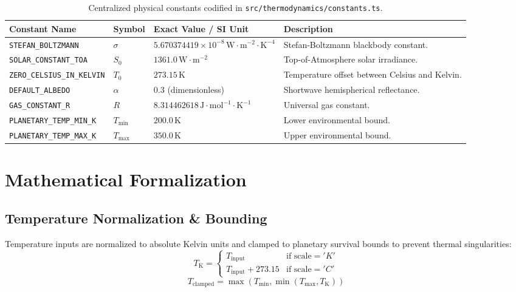 \documentclass[11pt, a4paper]{article}
\begin{document}
\begin{table}[htbp]
\centering
\begin{small}
\begin{tabular}{llll}
\toprule
\textbf{Constant Name} & \textbf{Symbol} & \textbf{Exact Value / SI Unit} & \textbf{Description} \\
\midrule
\texttt{STEFAN\_BOLTZMANN} & $\sigma$ & $5.670374419 \times 10^{-8} \, \text{W}\cdot\text{m}^{-2}\cdot\text{K}^{-4}$ & Stefan-Boltzmann blackbody constant. \\
\texttt{SOLAR\_CONSTANT\_TOA} & $S_0$ & $1361.0 \, \text{W}\cdot\text{m}^{-2}$ & Top-of-Atmosphere solar irradiance. \\
\texttt{ZERO\_CELSIUS\_IN\_KELVIN} & $T_0$ & $273.15 \, \text{K}$ & Temperature offset between Celsius and Kelvin. \\
\texttt{DEFAULT\_ALBEDO} & $\alpha$ & $0.3$ (dimensionless) & Shortwave hemispherical reflectance. \\
\texttt{GAS\_CONSTANT\_R} & $R$ & $8.314462618 \, \text{J}\cdot\text{mol}^{-1}\cdot\text{K}^{-1}$ & Universal gas constant. \\
\texttt{PLANETARY\_TEMP\_MIN\_K} & $T_{\min}$ & $200.0 \, \text{K}$ & Lower environmental bound. \\
\texttt{PLANETARY\_TEMP\_MAX\_K} & $T_{\max}$ & $350.0 \, \text{K}$ & Upper environmental bound. \\
\bottomrule
\end{tabular}
\end{small}
\caption{Centralized physical constants codified in \texttt{src/thermodynamics/constants.ts}.}
\label{tab:constants}
\end{table}

\section{Mathematical Formalization}

\subsection{Temperature Normalization \& Bounding}
Temperature inputs are normalized to absolute Kelvin units and clamped to planetary survival bounds to prevent thermal singularities:
\begin{equation}
T_{\text{K}} = \begin{cases} 
T_{\text{input}} & \text{if scale} = 'K' \\
T_{\text{input}} + 273.15 & \text{if scale} = 'C'
\end{cases}
\end{equation}
\begin{equation}
T_{\text{clamped}} = \max(T_{\min}, \min(T_{\max}, T_{\text{K}}))
\end{equation}
\end{document}
